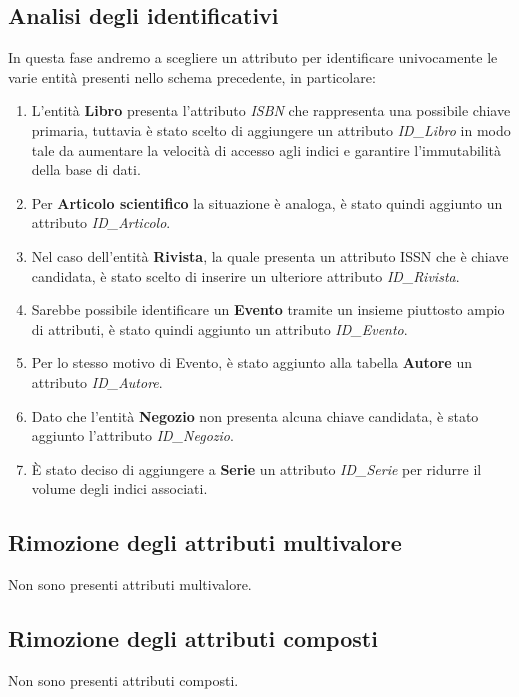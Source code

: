         \subsection{Analisi degli identificativi}
        In questa fase andremo a scegliere un attributo per identificare univocamente
        le varie entit\`a presenti nello schema precedente, in particolare:
            \begin{enumerate}
            \item L'entit\`a \textbf{Libro} presenta l'attributo \textit{ISBN} che rappresenta una possibile chiave primaria,
                  tuttavia \`e stato scelto di aggiungere un attributo \textit{ID\_Libro} in modo tale da aumentare
                  la velocit\`a di accesso agli indici e garantire l'immutabilit\`a della base di dati.
            \item Per \textbf{Articolo scientifico} la situazione \`e analoga, \`e stato quindi aggiunto un attributo
                  \textit{ID\_Articolo}.
            \item Nel caso dell'entit\`a \textbf{Rivista}, la quale presenta un attributo ISSN che \`e chiave candidata,
                  è stato scelto di inserire un ulteriore attributo \textit{ID\_Rivista}.
            \item Sarebbe possibile identificare un \textbf{Evento} tramite un insieme piuttosto ampio di attributi, \`e
                  stato quindi aggiunto un attributo \textit{ID\_Evento}.
            \item Per lo stesso motivo di Evento, \`e stato aggiunto alla tabella \textbf{Autore} un attributo \textit{ID\_Autore}.
            \item Dato che l'entit\`a \textbf{Negozio} non presenta alcuna chiave candidata, \`e stato aggiunto l'attributo
                  \textit{ID\_Negozio}.
            \item \`E stato deciso di aggiungere a \textbf{Serie} un attributo \textit{ID\_Serie} per ridurre il volume degli
                  indici associati.
            \end{enumerate}
        \subsection{Rimozione degli attributi multivalore}
            Non sono presenti attributi multivalore.
        \subsection{Rimozione degli attributi composti}
            Non sono presenti attributi composti.
